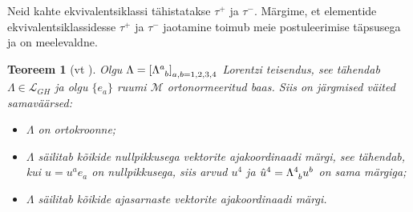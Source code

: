 \documentclass[12pt,a4paper,oneside]{article}
\theoremstyle{plain}
\newtheorem{teoreem}{Teoreem}[section]
\theoremstyle{definition}
\numberwithin{equation}{section}
\def\L{{\mathcal L}}
\def\M{{\mathcal M}}
\begin{document}
Neid kahte ekvivalentsiklassi tähistatakse $\tau^+$ ja $\tau^-$. 
Märgime, et elementide ekvivalentsiklassidesse $\tau^+$ ja $\tau^-$ 
jaotamine toimub meie postuleerimise täpsusega ja on meelevaldne.

\begin{teoreem}[vt \textnormal{\cite[teoreem 1.3.3]{Naber}}]
Olgu $\Lambda = \left[\Lambda\indices{^a_b}\right]_{a,b = 1,2,3,4}$ 
Lorentzi teisendus, see tähendab $\Lambda \in \L_{GH}$ ja olgu 
$\{e_a\}$ ruumi $\M$ orto\-normeeritud baas. Siis on järgmised 
väited samaväärsed:
\begin{itemize}
\item[\emph{(i)}] $\Lambda$ on ortokroonne;
\item[\emph{(ii)}] $\Lambda$ säilitab kõikide nullpikkusega vektorite 
ajakoordinaadi märgi, see tähendab, kui $u = u^a e_a$ on 
nullpikkusega, siis arvud $u^4$ ja $\hat{u}^4 = 
\Lambda\indices{^4_b} u^b$ on sama märgiga;
\item[\emph{(iii)}] $\Lambda$ säilitab kõikide ajasarnaste vektorite 
ajakoordinaadi märgi.
\end{itemize}
\end{teoreem}
\end{document}
